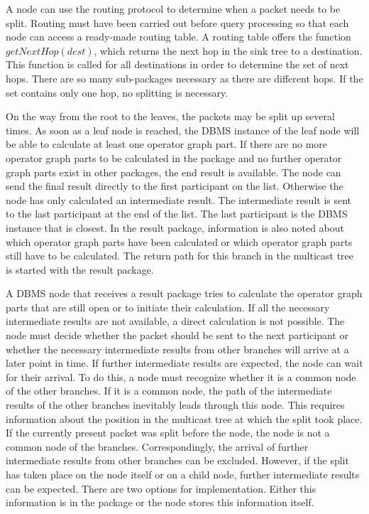 \documentclass[english,version-2019-11]{uzl-thesis}
\begin{document}
A node can use the routing protocol to determine when a packet needs to be split. Routing must have been carried out before query processing so that each node can access a ready-made routing table. A routing table offers the function $getNextHop(dest)$, which returns the next hop in the sink tree to a destination. This function is called for all destinations in order to determine the set of next hops. There are so many sub-packages necessary as there are different hops. If the set contains only one hop, no splitting is necessary.

On the way from the root to the leaves, the packets may be split up several times. As soon as a leaf node is reached, the DBMS instance of the leaf node will be able to calculate at least one operator graph part. If there are no more operator graph parts to be calculated in the package and no further operator graph parts exist in other packages, the end result is available. The node can send the final result directly to the first participant on the list. Otherwise the node has only calculated an intermediate result. The intermediate result is sent to the last participant at the end of the list. The last participant is the DBMS instance that is closest. In the result package, information is also noted about which operator graph parts have been calculated or which operator graph parts still have to be calculated. The return path for this branch in the multicast tree is started with the result package.

A DBMS node that receives a result package tries to calculate the operator graph parts that are still open or to initiate their calculation. If all the necessary intermediate results are not available, a direct calculation is not possible. The node must decide whether the packet should be sent to the next participant or whether the necessary intermediate results from other branches will arrive at a later point in time. If further intermediate results are expected, the node can wait for their arrival. To do this, a node must recognize whether it is a common node of the other branches. If it is a common node, the path of the intermediate results of the other branches inevitably leads through this node. This requires information about the position in the multicast tree at which the split took place. If the currently present packet was split before the node, the node is not a common node of the branches. Correspondingly, the arrival of further intermediate results from other branches can be excluded. However, if the split has taken place on the node itself or on a child node, further intermediate results can be expected. There are two options for implementation. Either this information is in the package or the node stores this information itself.
\end{document}
